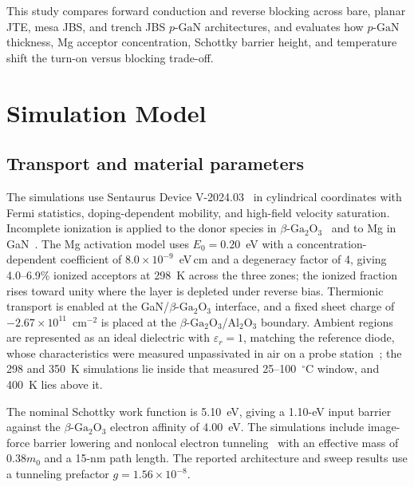 \documentclass[journal,10pt]{IEEEtran}
\newcommand{\GaO}{\ensuremath{\beta\text{-}\mathrm{Ga}_2\mathrm{O}_3}}
\newcommand{\pGaN}{\ensuremath{p\text{-}\mathrm{GaN}}}
\begin{document}
This study compares forward conduction and reverse blocking across bare, planar JTE, mesa JBS, and trench JBS \pGaN{} architectures, and evaluates how \pGaN{} thickness, Mg acceptor concentration, Schottky barrier height, and temperature shift the turn-on versus blocking trade-off.

\section{Simulation Model}
\subsection{Transport and material parameters}
The simulations use Sentaurus Device V-2024.03~\cite{Sentaurus2024} in cylindrical coordinates with Fermi statistics, doping-dependent mobility, and high-field velocity saturation. Incomplete ionization is applied to the donor species in \GaO{}~\cite{Neal2018_APL} and to Mg in GaN~\cite{Kozodoy2000_JAP}. The Mg activation model uses $E_0=0.20$~eV with a concentration-dependent coefficient of $8.0\times10^{-9}$~eV\,cm and a degeneracy factor of 4, giving 4.0--6.9\% ionized acceptors at 298~K across the three zones; the ionized fraction rises toward unity where the layer is depleted under reverse bias. Thermionic transport is enabled at the GaN/\GaO{} interface, and a fixed sheet charge of $-2.67\times10^{11}$~cm$^{-2}$ is placed at the \GaO/Al$_2$O$_3$ boundary. Ambient regions are represented as an ideal dielectric with $\varepsilon_r=1$, matching the reference diode, whose characteristics were measured unpassivated in air on a probe station~\cite{Yang2017}; the 298 and 350~K simulations lie inside that measured 25--100~$^\circ$C window, and 400~K lies above it.

The nominal Schottky work function is 5.10~eV, giving a 1.10-eV input barrier against the \GaO{} electron affinity of 4.00~eV. The simulations include image-force barrier lowering and nonlocal electron tunneling~\cite{Higashiwaki2016_APL,Li2020_APL} with an effective mass of $0.38m_0$ and a 15-nm path length. The reported architecture and sweep results use a tunneling prefactor $g=1.56\times10^{-8}$.
\end{document}
